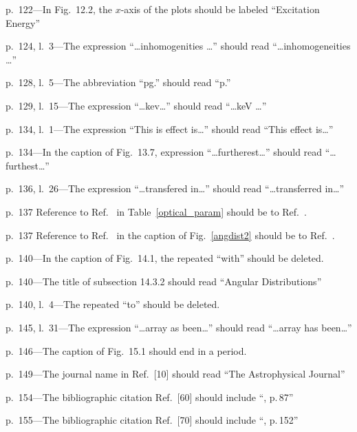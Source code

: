 	\item p.~122---In Fig.~12.2, the $x$-axis of the plots should be labeled ``Excitation Energy''
	\item p.~124, l.~3---The expression ``\ldots inhomogenities \ldots'' should read ``\ldots inhomogeneities \ldots''
	\item p.~128, l.~5---The abbreviation ``pg.'' should read ``p.'' 
	\item p.~129, l.~15---The expression ``\ldots kev\ldots'' should read ``\ldots keV \ldots''
	\item p.~134, l.~1---The expression ``This is effect is\ldots'' should read ``This effect is\ldots''
	\item p.~134---In the caption of Fig.~13.7, expression ``\ldots furtherest\ldots'' should read ``\ldots furthest\ldots''
	\item p.~136, l.~26---The expression ``\ldots transfered in\ldots'' should read ``\ldots transferred in\ldots'' 
	\item p.~137 Reference to Ref.~\cite{El_Bedewi_1972} in Table~\ref{optical_param} should be to Ref.~\cite{ElNaiem_1972}.
	\item p.~137 Reference to Ref.~\cite{El_Bedewi_1972} in the caption of Fig.~\ref{angdist2} should be to Ref.~\cite{ElNaiem_1972}.
	\item p.~140---In the caption of Fig.~14.1, the repeated ``with'' should be deleted.
	\item p.~140---The title of subsection 14.3.2 should read ``Angular Distributions''
	\item p.~140, l.~4---The repeated ``to'' should be deleted.
	\item p.~145, l.~31---The expression ``\ldots array as been\ldots'' should read ``\ldots array has been\ldots''
	\item p.~146---The caption of Fig.~15.1 should end in a period.
	\item p.~149---The journal name in Ref.~[10] should read ``The Astrophysical Journal''
	\item p.~154---The bibliographic citation Ref.~[60] should include ``, p.\,87''
	\item p.~155---The bibliographic citation Ref.~[70] should include ``, p.\,152''
